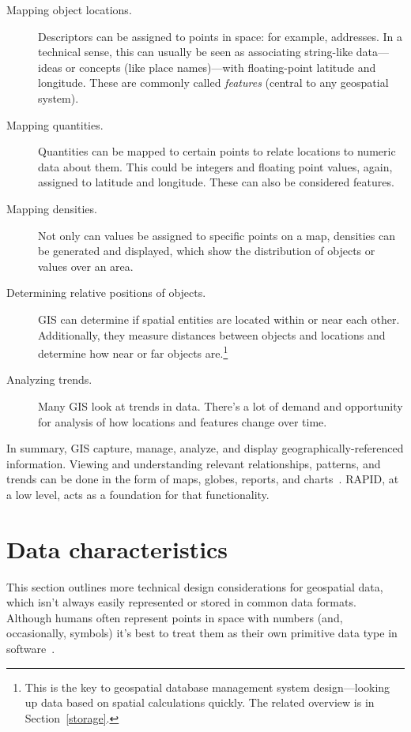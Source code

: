 \begin{description}
  \item[Mapping object locations.] Descriptors can be assigned to points in space: for example, addresses. In a technical sense, this can usually be seen as associating string-like data---ideas or concepts (like place names)---with floating-point latitude and longitude. These are commonly called \textit{features} (central to any geospatial system).
  \item[Mapping quantities.] Quantities can be mapped to certain points to relate locations to numeric data about them. This could be integers and floating point values, again, assigned to latitude and longitude. These can also be considered features.
  \item[Mapping densities.] Not only can values be assigned to specific points on a map, densities can be generated and displayed, which show the distribution of objects or values over an area.
  \item[Determining relative positions of objects.] GIS can determine if spatial entities are located within or near each other. Additionally, they measure distances between objects and locations and determine how near or far objects are.\footnote{This is the key to geospatial database management system design---looking up data based on spatial calculations quickly. The related overview is in Section~\ref{storage}.}
  \item[Analyzing trends.] Many GIS look at trends in data. There's a lot of demand and opportunity for analysis of how locations and features change over time.
\end{description}

In summary, GIS capture, manage, analyze, and display geographically-referenced information. Viewing and understanding relevant relationships, patterns, and trends can be done in the form of maps, globes, reports, and charts~\cite{Esriintro}. RAPID, at a low level, acts as a foundation for that functionality.

\section{Data characteristics}
This section outlines more technical design considerations for geospatial data, which isn't always easily represented or stored in common data formats. Although humans often represent points in space with numbers (and, occasionally, symbols) it's best to treat them as their own primitive data type in software~\cite{gentle_intro}.

